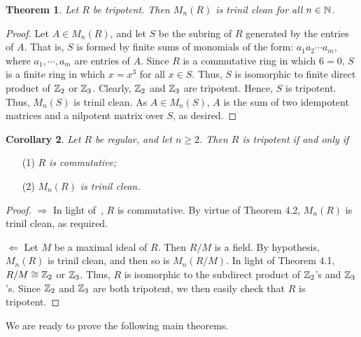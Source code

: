 \documentclass[12pt, reqno]{amsart}
\newtheorem{thm}{Theorem}[section]
\newtheorem{cor}[thm]{Corollary}
\numberwithin{equation}{section}
\begin{document}
\begin{thm} Let $R$ be tripotent. Then $M_n(R)$ is trinil clean for all $n\in {\Bbb N}$.\end{thm}
\begin{proof} Let $A\in M_n(R)$, and
let $S$ be the subring of $R$ generated by the entries of $A$.
That is, $S$ is formed by finite sums of monomials of the form:
$a_1a_2\cdots a_m$, where $a_1,\cdots,a_m$ are entries of $A$. Since $R$ is a
commutative ring in which $6=0$, $S$
is a finite ring in which $x=x^3$ for all $x\in S$. Thus, $S$ is isomorphic to finite direct
product of ${\Bbb Z}_2$ or ${\Bbb Z}_3$. Clearly, ${\Bbb Z}_2$ and ${\Bbb Z}_3$ are tripotent. Hence, $S$ is tripotent. Thus, $M_n(S)$ is
trinil clean. As $A\in M_n(S)$, $A$ is the sum of two idempotent matrices and a nilpotent matrix over $S$,
as desired.\end{proof}

\begin{cor} Let $R$ be regular, and let $n\geq 2$. Then $R$ is tripotent if and only if\end{cor}
\begin{enumerate}
\item [(1)]{\it $R$ is commutative;}
\vspace{-.5mm}
\item [(2)]{\it $M_n(R)$ is trinil clean.}
\end{enumerate}
\begin{proof} $\Longrightarrow $ In light of~\cite[Theorem 1]{HT}, $R$ is commutative. By virtue of Theorem 4.2, $M_n(R)$ is trinil clean, as required.

$\Longleftarrow $ Let $M$ be a maximal ideal of $R$. Then $R/M$ is a field. By hypothesis, $M_n(R)$ is trinil clean, and then so is $M_n(R/M)$.
In light of Theorem 4.1, $R/M\cong {\Bbb Z}_2$ or ${\Bbb Z}_3$. Thus, $R$ is isomorphic to the subdirect product of ${\Bbb Z}_2$'s and ${\Bbb Z}_3$'s.
Since ${\Bbb Z}_2$ and ${\Bbb Z}_3$ are both tripotent, we then easily check that $R$ is tripotent.\end{proof}

We are ready to prove the following main theorems.
\end{document}
